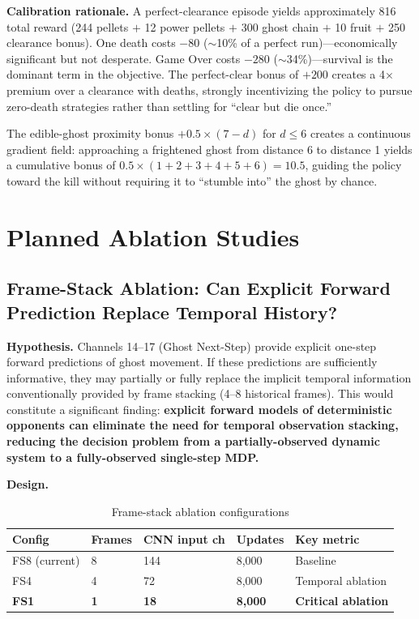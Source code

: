\documentclass[11pt,a4paper]{article}
\theoremstyle{definition}
\begin{document}
\textbf{Calibration rationale.}
A perfect-clearance episode yields approximately 816 total reward (244 pellets $+$ 12 power pellets $+$ 300 ghost chain $+$ 10 fruit $+$ 250 clearance bonus).
One death costs $-80$ ($\sim$10\% of a perfect run)---economically significant but not desperate.
Game Over costs $-280$ ($\sim$34\%)---survival is the dominant term in the objective.
The perfect-clear bonus of $+200$ creates a 4$\times$ premium over a clearance with deaths, strongly incentivizing the policy to pursue zero-death strategies rather than settling for ``clear but die once.''

The edible-ghost proximity bonus $+0.5 \times (7 - d)$ for $d \leq 6$ creates a continuous gradient field: approaching a frightened ghost from distance 6 to distance 1 yields a cumulative bonus of $0.5 \times (1 + 2 + 3 + 4 + 5 + 6) = 10.5$, guiding the policy toward the kill without requiring it to ``stumble into'' the ghost by chance.

\section{Planned Ablation Studies}

\subsection{Frame-Stack Ablation: Can Explicit Forward Prediction Replace Temporal History?}

\textbf{Hypothesis.}
Channels 14--17 (Ghost Next-Step) provide explicit one-step forward predictions of ghost movement.
If these predictions are sufficiently informative, they may partially or fully replace the implicit temporal information conventionally provided by frame stacking (4--8 historical frames).
This would constitute a significant finding: \textbf{explicit forward models of deterministic opponents can eliminate the need for temporal observation stacking, reducing the decision problem from a partially-observed dynamic system to a fully-observed single-step MDP.}

\textbf{Design.}

\begin{table}[ht]
\centering
\small
\caption{Frame-stack ablation configurations}
\label{tab:fs-ablation}
\begin{tabular}{@{}p{2cm}p{2cm}p{2.5cm}p{2cm}p{3cm}@{}}
\toprule
\textbf{Config} & \textbf{Frames} & \textbf{CNN input ch} & \textbf{Updates} & \textbf{Key metric} \\
\midrule
FS8 (current) & 8 & 144 & 8,000 & Baseline \\
FS4 & 4 & 72 & 8,000 & Temporal ablation \\
\textbf{FS1} & \textbf{1} & \textbf{18} & \textbf{8,000} & \textbf{Critical ablation} \\
\bottomrule
\end{tabular}
\end{table}
\end{document}

